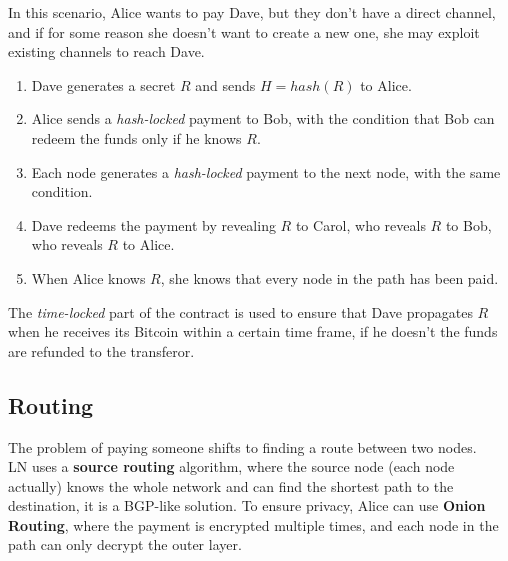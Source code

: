 In this scenario, Alice wants to pay Dave, but they don't have a direct channel, and if for some reason she doesn't want to create a new one, she may exploit existing channels to reach Dave.
\begin{enumerate}
   \item Dave generates a secret $R$ and sends $H = hash(R)$ to Alice.
   \item Alice sends a \textit{hash-locked} payment to Bob, with the condition that Bob can redeem the funds only if he knows $R$.
   \item Each node generates a \textit{hash-locked} payment to the next node, with the same condition.
   \item Dave redeems the payment by revealing $R$ to Carol, who reveals $R$ to Bob, who reveals $R$ to Alice.
   \item When Alice knows $R$, she knows that every node in the path has been paid.
\end{enumerate}


The \textit{time-locked} part of the contract is used to ensure that Dave propagates $R$ when he receives its Bitcoin within a certain time frame, if he doesn't the funds are refunded to the transferor.

\subsection{Routing}
The problem of paying someone shifts to finding a route between two nodes.\\
LN uses a \textbf{source routing} algorithm, where the source node (each node actually) knows the whole network and can find the shortest path to the destination, it is a BGP-like solution.
To ensure privacy, Alice can use \textbf{Onion Routing}, where the payment is encrypted multiple times, and each node in the path can only decrypt the outer layer.

